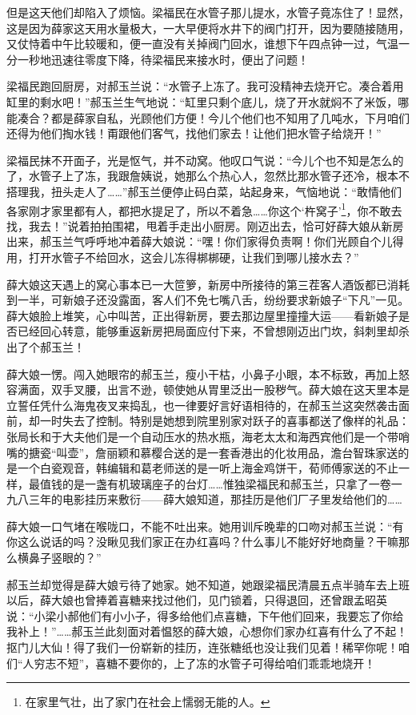 \par 但是这天他们却陷入了烦恼。梁福民在水管子那儿提水，水管子竟冻住了！显然，这是因为薛家这天用水量极大，一大早便将水井下的阀门打开，因为要随接随用，又仗恃着中午比较暖和，便一直没有关掉阀门回水，谁想下午四点钟一过，气温一分一秒地迅速往零度下降，待梁福民来接水时，便出了问题！
\par 梁福民跑回厨房，对郝玉兰说：“水管子上冻了。我可没精神去烧开它。凑合着用缸里的剩水吧！”郝玉兰生气地说：“缸里只剩个底儿，烧了开水就焖不了米饭，哪能凑合？都是薛家自私，光顾他们方便！今儿个他们也不知用了几吨水，下月咱们还得为他们掏水钱！甭跟他们客气，找他们家去！让他们把水管子给烧开！”
\par 梁福民抹不开面子，光是怄气，并不动窝。他叹口气说：“今儿个也不知是怎么的了，水管子上了冻，我跟詹姨说，她那么个热心人，忽然比那水管子还冷，根本不搭理我，扭头走人了……”郝玉兰便停止码白菜，站起身来，气恼地说：“敢情他们各家刚才家里都有人，都把水提足了，所以不着急……你这个‘杵窝子’\footnote{在家里气壮，出了家门在社会上懦弱无能的人。}，你不敢去找，我去！”说着拍拍围裙，甩着手走出小厨房。刚迈出去，恰可好薛大娘从新房出来，郝玉兰气呼呼地冲着薛大娘说：“嘿！你们家得负责啊！你们光顾自个儿得用，打开水管子不给回水，这会儿冻得梆梆硬，让我们到哪儿接水去？”
\par 薛大娘这天遇上的窝心事本已一大笸箩，新房中所接待的第三茬客人酒饭都已消耗到一半，可新娘子还没露面，客人们不免七嘴八舌，纷纷要求新娘子“下凡”一见。薛大娘脸上堆笑，心中叫苦，正出得新房，要去那边屋里撞撞大运——看新娘子是否已经回心转意，能够重返新房把局面应付下来，不曾想刚迈出门坎，斜刺里却杀出了个郝玉兰！
\par 薛大娘一愣。闯入她眼帘的郝玉兰，瘦小干枯，小鼻子小眼，本不标致，再加上怒容满面，双手叉腰，出言不逊，顿使她从胃里泛出一股秽气。薛大娘在这天里本是立誓任凭什么海鬼夜叉来捣乱，也一律要好言好语相待的，在郝玉兰这突然袭击面前，却一时失去了控制。特别是她想到院里别家对跃子的喜事都送了像样的礼品：张局长和于大夫他们是一个自动压水的热水瓶，海老太太和海西宾他们是一个带哨嘴的搪瓷“叫壶”，詹丽颖和慕樱合送的是一套香港出的化妆用品，澹台智珠家送的是一个白瓷观音，韩编辑和葛老师送的是一听上海金鸡饼干，荀师傅家送的不止一样，最值钱的是一盏有机玻璃座子的台灯……惟独梁福民和郝玉兰，只拿了一卷一九八三年的电影挂历来敷衍——薛大娘知道，那挂历是他们厂子里发给他们的……
\par 薛大娘一口气堵在喉咙口，不能不吐出来。她用训斥晚辈的口吻对郝玉兰说：“有你这么说话的吗？没瞅见我们家正在办红喜吗？什么事儿不能好好地商量？干嘛那么横鼻子竖眼的？”
\par 郝玉兰却觉得是薛大娘亏待了她家。她不知道，她跟梁福民清晨五点半骑车去上班以后，薛大娘也曾捧着喜糖来找过他们，见门锁着，只得退回，还曾跟孟昭英说：“小梁小郝他们有小小子，得多给他们点喜糖，下午他们回来，我要忘了你给我补上！”……郝玉兰此刻面对着愠怒的薛大娘，心想你们家办红喜有什么了不起！抠门儿大仙！得了我们一份崭新的挂历，连张糖纸也没让我们见着！稀罕你呢！咱们“人穷志不短”，喜糖不要你的，上了冻的水管子可得给咱们乖乖地烧开！
